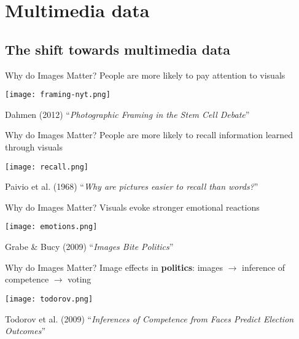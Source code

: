 \section{Multimedia data}


\subsection{The shift towards multimedia data}

\begin{frame}{Why do Images Matter?}
  \large{People are more likely to pay attention to visuals}
  
  \texttt{[image: framing-nyt.png]} \centering
  
  \vfill
  \footnotesize Dahmen (2012) ``\textit{Photographic Framing in the Stem Cell Debate}''
  
  \end{frame}
  
  \begin{frame}{Why do Images Matter?}
  \large{People are more likely to recall information learned through visuals}
  
  \texttt{[image: recall.png]} \centering
  
  \vfill
  \footnotesize Paivio et al. (1968) ``\textit{Why are pictures easier to recall than words?}''
  
  \end{frame}
  
  \begin{frame}{Why do Images Matter?}
  \large{Visuals evoke stronger emotional reactions}
  
  \texttt{[image: emotions.png]} \centering
  
  \vfill
  \footnotesize Grabe \& Bucy (2009) ``\textit{Images Bite Politics}''
  
  \end{frame}
  
  
  \begin{frame}{Why do Images Matter?}
  \large{Image effects in \textbf{politics}: images $\rightarrow$ inference of competence $\rightarrow$ voting}
  
  \texttt{[image: todorov.png]} \centering
  
  \vfill
  \footnotesize Todorov et al. (2009) ``\textit{Inferences of Competence from Faces Predict Election Outcomes}''
  
  \end{frame}
  
